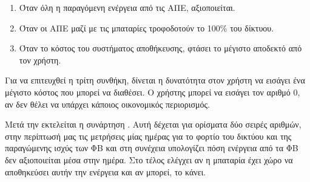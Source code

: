 \documentclass[12pt]{report}
\begin{document}
{\begin{enumerate}
\item Όταν όλη η παραγόμενη ενέργεια από τις ΑΠΕ, αξιοποιείται.
\item Όταν οι ΑΠΕ μαζί με τις μπαταρίες τροφοδοτούν το 100\% του δίκτυου.
\item Όταν το κόστος του συστήματος αποθήκευσης, φτάσει το μέγιστο αποδεκτό από τον χρήστη.
\end{enumerate}

Για να επιτευχθεί η τρίτη συνθήκη, δίνεται η δυνατότητα στον χρήστη να εισάγει ένα μέγιστο κόστος που μπορεί να διαθέσει. 
O χρήστης μπορεί να εισάγει τον αριθμό 0, αν δεν θέλει να υπάρχει κάποιος οικονομικός περιορισμός.

Μετά την {} εκτελείται η συνάρτηση {}. Αυτή δέχεται για ορίσματα δύο σειρές αριθμών,
στην περίπτωσή μας τις μετρήσεις μίας ημέρας για το φορτίο του δικτύου και της παραγώμενης ισχύς των ΦΒ και στη συνέχεια υπολογίζει 
πόση ενέργεια από τα ΦΒ δεν αξιοποιείται μέσα στην ημέρα. Στο τέλος ελέγχει αν η μπαταρία έχει χώρο να αποθηκεύσει αυτήν την ενέργεια και
αν μπορεί, το κάνει. 
}
\end{document}
